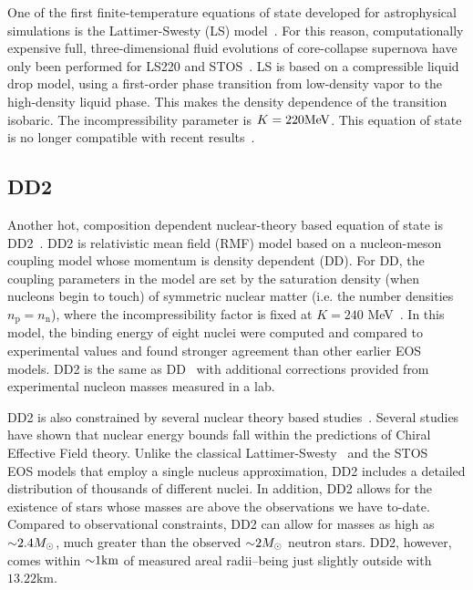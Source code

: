 One of the first finite-temperature equations of state developed for astrophysical simulations is the Lattimer-Swesty (LS) model~\cite{Lattimer:1991nc}.  
For this reason, computationally expensive full, three-dimensional fluid evolutions of core-collapse supernova have only been performed for LS220 and STOS~\cite{Marek2009}.
LS is based on a compressible liquid drop model, using a first-order phase transition from low-density vapor to the high-density liquid phase.  
This makes the density dependence of the transition isobaric.  
The incompressibility parameter is $K = 220 {\rm MeV}$.
This equation of state is no longer compatible with recent results~\cite{Fischer2014}.

\subsection{DD2}
\label{sec:dd2}

Another hot, composition dependent nuclear-theory based equation of state is DD2~\cite{typel2010composition}.  DD2 is relativistic mean field (RMF) model based on a nucleon-meson coupling model whose momentum is density dependent (DD).  
For DD, the coupling parameters in the model are set by the saturation density (when nucleons begin to touch) of symmetric nuclear matter (i.e. the number densities $n_\textrm{p} = n_\textrm{n}$), where the incompressibility factor is fixed at $K = 240$ MeV~\cite{typel2005relativistic}.
In this model, the binding energy of eight nuclei were computed and compared to experimental values and found stronger agreement than other earlier EOS models.
DD2 is the same as DD~\cite{typel2005relativistic} with additional corrections provided from experimental nucleon masses measured in a lab.

DD2 is also constrained by several nuclear theory based studies~\cite{hempel2012new}.
Several studies have shown that nuclear energy bounds fall within the predictions of Chiral Effective Field theory.
Unlike the classical Lattimer-Swesty~\cite{Lattimer:1991nc} and the STOS ~\cite{Shen:1998gq} EOS models that employ a single nucleus approximation, DD2 includes a detailed distribution of thousands of different nuclei.
In addition, DD2 allows for the existence of stars whose masses are above the observations we have to-date.
Compared to observational constraints, DD2 can allow for masses as high as $\mathord{\sim} 2.4 M_\odot$, much greater than the observed $\mathord{\sim} 2 M_\odot$ neutron stars.
DD2, however, comes within $\mathord{\sim} 1 \textrm{km}$ of measured areal radii--being just slightly outside with $13.22 \textrm{km}$.

